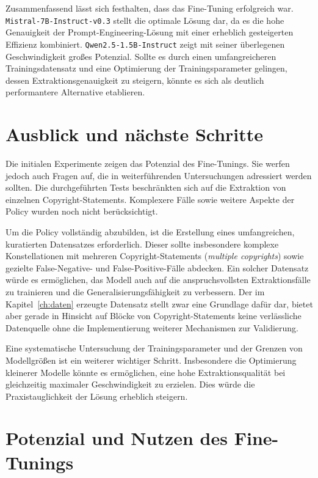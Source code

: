 Zusammenfassend lässt sich festhalten, dass das Fine-Tuning erfolgreich war.
\texttt{Mistral-7B-Instruct-v0.3} stellt die optimale Lösung dar, da es die hohe Genauigkeit der Prompt-Engineering-Lösung mit einer erheblich gesteigerten Effizienz kombiniert.
\texttt{Qwen2.5-1.5B-Instruct} zeigt mit seiner überlegenen Geschwindigkeit großes Potenzial.
Sollte es durch einen umfangreicheren Trainingsdatensatz und eine Optimierung der Trainingsparameter gelingen, dessen Extraktionsgenauigkeit zu steigern, könnte es sich als deutlich performantere Alternative etablieren.

\section{Ausblick und nächste Schritte}

Die initialen Experimente zeigen das Potenzial des Fine-Tunings.
Sie werfen jedoch auch Fragen auf, die in weiterführenden Untersuchungen adressiert werden sollten.
Die durchgeführten Tests beschränkten sich auf die Extraktion von einzelnen Copyright-Statements.
Komplexere Fälle sowie weitere Aspekte der Policy wurden noch nicht berücksichtigt.

Um die Policy vollständig abzubilden, ist die Erstellung eines umfangreichen, kuratierten Datensatzes erforderlich.
Dieser sollte insbesondere komplexe Konstellationen mit mehreren Copyright-Statements (\textit{multiple copyrights}) sowie gezielte False-Negative- und False-Positive-Fälle abdecken.
Ein solcher Datensatz würde es ermöglichen, das Modell auch auf die anspruchsvollsten Extraktionsfälle zu trainieren und die Generalisierungsfähigkeit zu verbessern.
Der im Kapitel~\ref{ch:daten} erzeugte Datensatz stellt zwar eine Grundlage dafür dar, bietet aber gerade in Hinsicht auf Blöcke von Copyright-Statements keine verlässliche Datenquelle ohne die Implementierung weiterer Mechanismen zur Validierung.

Eine systematische Untersuchung der Trainingsparameter und der Grenzen von Modellgrößen ist ein weiterer wichtiger Schritt.
Insbesondere die Optimierung kleinerer Modelle könnte es ermöglichen, eine hohe Extraktionsqualität bei gleichzeitig maximaler Geschwindigkeit zu erzielen.
Dies würde die Praxistauglichkeit der Lösung erheblich steigern.

\section{Potenzial und Nutzen des Fine-Tunings}

